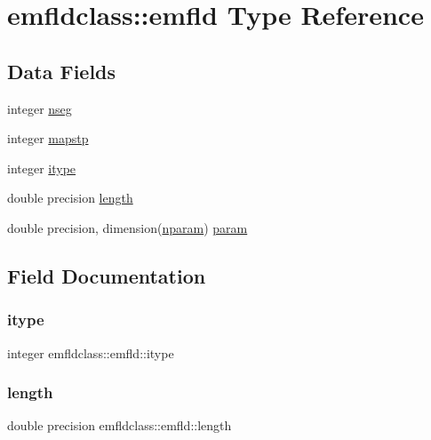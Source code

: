 \hypertarget{structemfldclass_1_1emfld}{}\section{emfldclass\+::emfld Type Reference}
\label{structemfldclass_1_1emfld}
\subsection*{Data Fields}
\begin{DoxyCompactItemize}
\item 
integer \mbox{\hyperlink{structemfldclass_1_1emfld_a35f0c51ff70d545cef92bbbfa9546006}{nseg}}
\item 
integer \mbox{\hyperlink{structemfldclass_1_1emfld_ac18dfbe320fc1dc13393780eb0ae2613}{mapstp}}
\item 
integer \mbox{\hyperlink{structemfldclass_1_1emfld_aa9a88075072a030b64fd3878793b499b}{itype}}
\item 
double precision \mbox{\hyperlink{structemfldclass_1_1emfld_a4938896636fb9fa907f15b621831cf97}{length}}
\item 
double precision, dimension(\mbox{\hyperlink{namespaceemfldclass_ad6fed90f4153b92a9a9ff35a6ef146c3}{nparam}}) \mbox{\hyperlink{structemfldclass_1_1emfld_ac4480d690e4e4d88d88ba939af8213cd}{param}}
\end{DoxyCompactItemize}


\subsection{Field Documentation}
\mbox{\label{structemfldclass_1_1emfld_aa9a88075072a030b64fd3878793b499b}} 
\subsubsection{\texorpdfstring{itype}{itype}}
{\footnotesize\ttfamily integer emfldclass\+::emfld\+::itype}

\mbox{\label{structemfldclass_1_1emfld_a4938896636fb9fa907f15b621831cf97}} 
\subsubsection{\texorpdfstring{length}{length}}
{\footnotesize\ttfamily double precision emfldclass\+::emfld\+::length}

